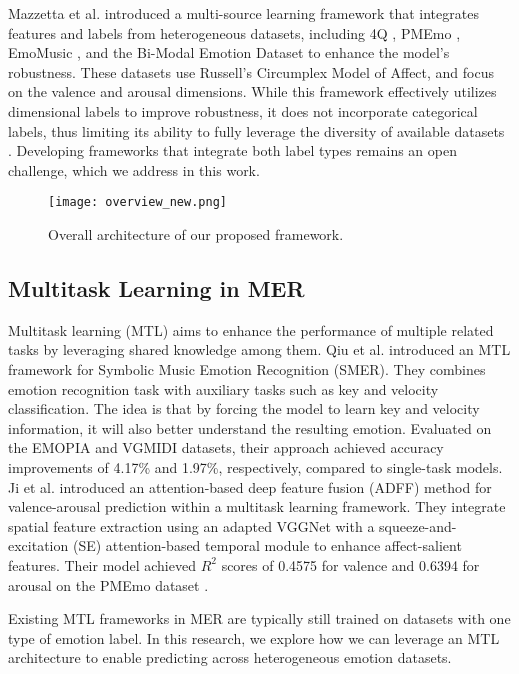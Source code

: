 Mazzetta et al. \cite{multi-source-mer2024} introduced a multi-source learning framework that integrates features and labels from heterogeneous datasets, including 4Q \cite{panda2018musical}, PMEmo \cite{zhang2018pmemo}, EmoMusic \cite{soleymani20131000}, and the Bi-Modal Emotion Dataset \cite{malheiro2016bi} to enhance the model’s robustness. These datasets use Russell’s Circumplex Model of Affect, and focus on the valence and arousal dimensions. While this framework effectively utilizes dimensional labels to improve robustness, it does not incorporate categorical labels, thus limiting its ability to fully leverage the diversity of available datasets \cite{kang2024we}. Developing frameworks that integrate both label types remains an open challenge, which we address in this work.

\begin{figure*}[!ht]
\centering
\texttt{[image: overview\_new.png]}
\caption{Overall architecture of our proposed framework.}
\label{fig:framework}
\end{figure*}

\subsection{Multitask Learning in MER}
Multitask learning (MTL) \cite{caruana1997multitask} aims to enhance the performance of multiple related tasks by leveraging shared knowledge among them. Qiu et al. \cite{qiu2022novel} introduced an MTL framework for Symbolic Music Emotion Recognition (SMER). They combines emotion recognition task with auxiliary tasks such as key and velocity classification. The idea is that by forcing the model to learn key and velocity information, it will also better understand the resulting emotion. Evaluated on the EMOPIA \cite{hung2021emopia} and VGMIDI \cite{ferreira2021learning} datasets, their approach achieved accuracy improvements of 4.17\% and 1.97\%, respectively, compared to single-task models. Ji et al. \cite{huang2022adff} introduced an attention-based deep feature fusion (ADFF) method for valence-arousal prediction within a multitask learning framework. They integrate spatial feature extraction using an adapted VGGNet with a squeeze-and-excitation (SE) attention-based temporal module to enhance affect-salient features. Their model achieved \(R^2\) scores of 0.4575 for valence and 0.6394 for arousal on the PMEmo dataset \cite{zhang2018pmemo}.

Existing MTL frameworks in MER are typically still trained on datasets with one type of emotion label. In this research, we explore how we can leverage an MTL architecture to enable predicting across heterogeneous emotion datasets.


